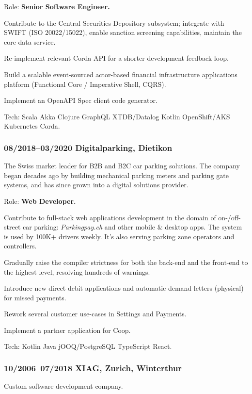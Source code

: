 \documentclass[a4paper, twocolumn, 10pt]{article}
\begin{document}
Role: \textbf{Senior Software Engineer.}

Contribute to the Central Securities Depository subsystem; integrate with SWIFT (ISO 20022/15022),
enable sanction screening capabilities, maintain the core data service.

Re-implement relevant Corda API for a shorter development feedback loop.

Build a scalable event-sourced actor-based financial infrastructure applications platform (Functional Core /
Imperative Shell, CQRS).

Implement an OpenAPI Spec client code generator.

Tech: Scala Akka Clojure GraphQL XTDB/Datalog Kotlin OpenShift/AKS Kubernetes Corda.

\subsubsection*{08/2018--03/2020 Digitalparking, Dietikon}

The Swiss market leader for B2B and B2C car parking solutions. The company began decades ago by
building mechanical parking meters and parking gate systems, and has since grown into a digital
solutions provider.

Role: \textbf{Web Developer.}

Contribute to full-stack web applications development in the domain of on-/off-street car parking:
\emph{Parkingpay.ch} and other mobile \& desktop apps. The system is used by 100K+ drivers
weekly. It's also serving parking zone operators and controllers.

Gradually raise the compiler strictness for both the back-end and the front-end to the highest
level, resolving hundreds of warnings.

Introduce new direct debit applications and automatic demand letters (physical) for missed payments.

Rework several customer use-cases in Settings and Payments.

Implement a partner application for Coop.

Tech: Kotlin Java jOOQ/PostgreSQL TypeScript React.

\subsubsection*{10/2006--07/2018 XIAG, Zurich, Winterthur}

Custom software development company.
\end{document}
